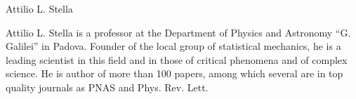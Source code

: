\begin{participant}[type=PI,PM=8,gender=male,salary=11404.33]{Attilio L. Stella}

Attilio L. Stella is a professor at the Department of Physics and Astronomy ``G. Galilei'' in Padova. Founder of the local group of statistical mechanics, he is a leading scientist in this field and in those of critical phenomena and of complex science. He is author of more than 100 papers, among which several are in top quality journals as PNAS and Phys. Rev. Lett.

\end{participant}

